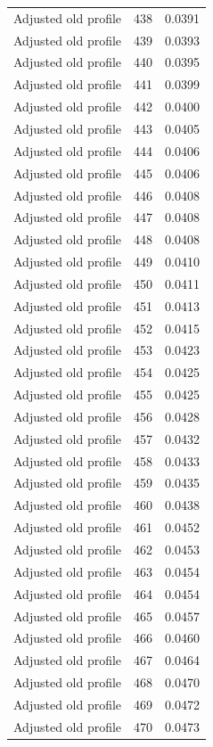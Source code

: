 \begin{table}[htbp]
\begin{tabular}{lll}
Adjusted old profile & 438 & 0.0391 \\
Adjusted old profile & 439 & 0.0393 \\
Adjusted old profile & 440 & 0.0395 \\
Adjusted old profile & 441 & 0.0399 \\
Adjusted old profile & 442 & 0.0400 \\
Adjusted old profile & 443 & 0.0405 \\
Adjusted old profile & 444 & 0.0406 \\
Adjusted old profile & 445 & 0.0406 \\
Adjusted old profile & 446 & 0.0408 \\
Adjusted old profile & 447 & 0.0408 \\
Adjusted old profile & 448 & 0.0408 \\
Adjusted old profile & 449 & 0.0410 \\
Adjusted old profile & 450 & 0.0411 \\
Adjusted old profile & 451 & 0.0413 \\
Adjusted old profile & 452 & 0.0415 \\
Adjusted old profile & 453 & 0.0423 \\
Adjusted old profile & 454 & 0.0425 \\
Adjusted old profile & 455 & 0.0425 \\
Adjusted old profile & 456 & 0.0428 \\
Adjusted old profile & 457 & 0.0432 \\
Adjusted old profile & 458 & 0.0433 \\
Adjusted old profile & 459 & 0.0435 \\
Adjusted old profile & 460 & 0.0438 \\
Adjusted old profile & 461 & 0.0452 \\
Adjusted old profile & 462 & 0.0453 \\
Adjusted old profile & 463 & 0.0454 \\
Adjusted old profile & 464 & 0.0454 \\
Adjusted old profile & 465 & 0.0457 \\
Adjusted old profile & 466 & 0.0460 \\
Adjusted old profile & 467 & 0.0464 \\
Adjusted old profile & 468 & 0.0470 \\
Adjusted old profile & 469 & 0.0472 \\
Adjusted old profile & 470 & 0.0473 \\

\end{tabular}
\end{table}
